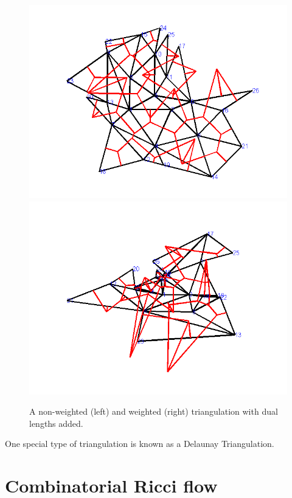 \documentclass[12pt]{article}
\begin{document}
\begin{figure}
\centering
\includegraphics[scale = .45]{Pictures/nonwduals.png}
\includegraphics[scale = .45]{Pictures/Wduals.png}
\caption{A non-weighted (left) and weighted (right) triangulation with dual lengths added.}
\end{figure}



\noindent One special type of triangulation is known as a Delaunay Triangulation.


\section{Combinatorial Ricci flow}
\label{RBk}
\end{document}
